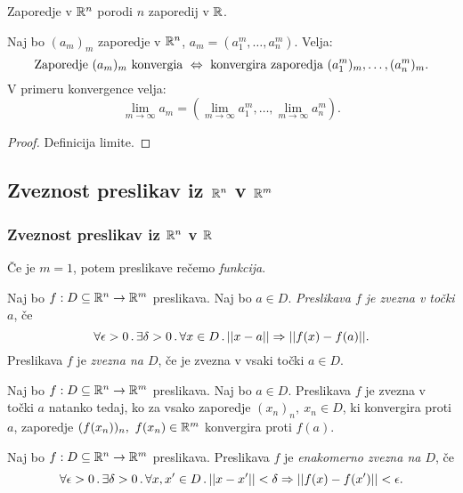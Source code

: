 \begin{opomba}
    Zaporedje v $\mathbb{R}^n$ porodi $n$ zaporedij v $\mathbb{R}$.
\end{opomba}

\begin{trditev}
    Naj bo $(a_m)_m$ zaporedje v $\mathbb{R}^n$, $a_m = (a_1^m, \ldots, a_n^m)$. Velja:
    $$\text{Zaporedje } (a_m)_m \text{ konvergia } \Leftrightarrow \text{ konvergira zaporedja } (a_1^m)_m, \ldots, (a_n^m)_m.$$
    V primeru konvergence velja:
    $$\lim_{m \to \infty} a_m = (\lim_{m \to \infty} a_1^m, \ldots, \lim_{m \to \infty} a_n^m).$$
\end{trditev}

\begin{proof}
    Definicija limite.
\end{proof}

\newpage
\subsection{Zveznost preslikav iz $\mathbb{R}^n$ v $\mathbb{R}^m$}
\subsubsection{Zveznost preslikav iz $\mathbb{R}^n$ v $\mathbb{R}$}

\begin{opomba}
    Če je $m=1$, potem preslikave rečemo \emph{funkcija}.
\end{opomba}

\begin{definicija}
    Naj bo $f: D \subseteq \mathbb{R}^n \to \mathbb{R}^m$ preslikava. Naj bo $a \in D$. \emph{Preslikava $f$ je zvezna v točki $a$}, če 
    $$\forall \epsilon > 0 \,.\, \exists \delta >0 \,.\, \forall x \in D \,.\, ||x-a|| \Rightarrow ||f(x)- f(a)||.$$
    Preslikava $f$ je \emph{zvezna na $D$}, če je zvezna v vsaki točki $a \in D$.
\end{definicija}

\begin{trditev}
    Naj bo $f: D \subseteq \mathbb{R}^n \to \mathbb{R}^m$ preslikava. Naj bo $a \in D$. Preslikava $f$ je zvezna v točki $a$ natanko tedaj, ko za vsako zaporedje $(x_n)_n, \ x_n \in D$, ki konvergira proti $a$, zaporedje $(f(x_n))_n, \ f(x_n) \in \mathbb{R}^m$ konvergira proti $f(a)$.
\end{trditev}

\begin{definicija}
    Naj bo $f: D \subseteq \mathbb{R}^n \to \mathbb{R}^m$ preslikava. Preslikava $f$ je \emph{enakomerno zvezna na $D$}, če
    $$\forall \epsilon > 0 \,.\, \exists \delta > 0 \,.\, \forall x, x' \in D \,.\, ||x - x'|| < \delta \Rightarrow ||f(x) - f(x')|| < \epsilon.$$
\end{definicija}

